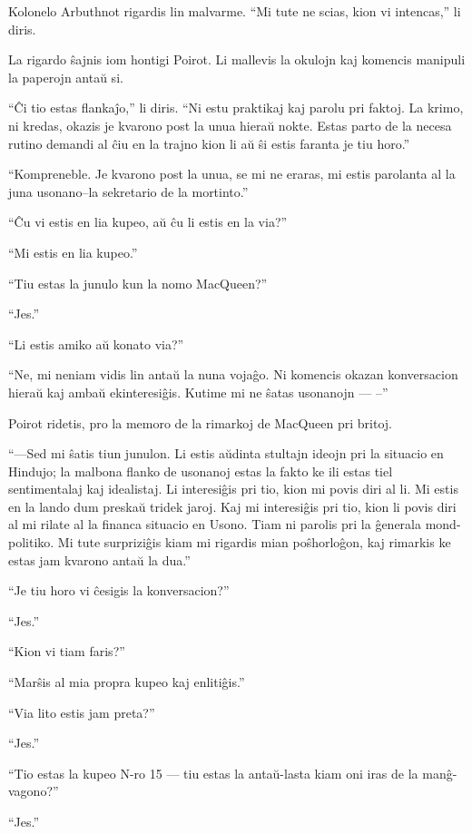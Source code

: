 Kolonelo Arbuthnot rigardis lin malvarme. ``Mi tute ne scias, kion vi intencas,'' li diris.

La rigardo ŝajnis iom hontigi Poirot. Li mallevis la okulojn kaj komencis manipuli la paperojn antaŭ si.

``Ĉi tio estas flankaĵo,'' li diris. ``Ni estu praktikaj kaj parolu pri faktoj. La krimo, ni kredas, okazis je kvarono post la unua hieraŭ nokte. Estas parto de la necesa rutino demandi al ĉiu en la trajno kion li aŭ ŝi estis faranta je tiu horo.''

``Kompreneble. Je kvarono post la unua, se mi ne eraras, mi estis parolanta al la juna usonano--la sekretario de la mortinto.''

``Ĉu vi estis en lia kupeo, aŭ ĉu li estis en la via?''

``Mi estis en lia kupeo.''

``Tiu estas la junulo kun la nomo MacQueen?''

``Jes.''

``Li estis amiko aŭ konato via?''

``Ne, mi neniam vidis lin antaŭ la nuna vojaĝo. Ni komencis okazan konversacion hieraŭ kaj ambaŭ ekinteresiĝis. Kutime mi ne ŝatas usonanojn --- --''

Poirot ridetis, pro la memoro de la rimarkoj de MacQueen pri britoj.

``---Sed mi ŝatis tiun junulon. Li estis aŭdinta stultajn ideojn pri la situacio en Hindujo; la malbona flanko de usonanoj estas la fakto ke ili estas tiel sentimentalaj kaj idealistaj. Li interesiĝis pri tio, kion mi povis diri al li. Mi estis en la lando dum preskaŭ tridek jaroj. Kaj mi interesiĝis pri tio, kion li povis diri al mi rilate al la financa situacio en Usono. Tiam ni parolis pri la ĝenerala mond-politiko. Mi tute surpriziĝis kiam mi rigardis mian poŝhorloĝon, kaj rimarkis ke estas jam kvarono antaŭ la dua.''

``Je tiu horo vi ĉesigis la konversacion?''

``Jes.''

``Kion vi tiam faris?''

``Marŝis al mia propra kupeo kaj enlitiĝis.''

``Via lito estis jam preta?''

``Jes.''

``Tio estas la kupeo N-ro 15 --- tiu estas la antaŭ-lasta kiam oni iras de la manĝ-vagono?''

``Jes.''

